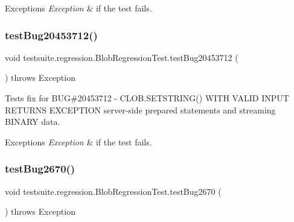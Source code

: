 \begin{DoxyExceptions}{Exceptions}
{\em Exception} & if the test fails. \\
\hline
\end{DoxyExceptions}
\mbox{\label{classtestsuite_1_1regression_1_1_blob_regression_test_a044b5dc71a945042d8533a95202d17c4}} 
\subsubsection{\texorpdfstring{test\+Bug20453712()}{testBug20453712()}}
{\footnotesize\ttfamily void testsuite.\+regression.\+Blob\+Regression\+Test.\+test\+Bug20453712 (\begin{DoxyParamCaption}{ }\end{DoxyParamCaption}) throws Exception}

Tests fix for B\+UG\#20453712 -\/ C\+L\+O\+B.\+S\+E\+T\+S\+T\+R\+I\+N\+G() W\+I\+TH V\+A\+L\+ID I\+N\+P\+UT R\+E\+T\+U\+R\+NS E\+X\+C\+E\+P\+T\+I\+ON server-\/side prepared statements and streaming B\+I\+N\+A\+RY data.


\begin{DoxyExceptions}{Exceptions}
{\em Exception} & if the test fails. \\
\hline
\end{DoxyExceptions}
\mbox{\label{classtestsuite_1_1regression_1_1_blob_regression_test_ade5e73c4533b3bad28500f3ece35dc94}} 
\subsubsection{\texorpdfstring{test\+Bug2670()}{testBug2670()}}
{\footnotesize\ttfamily void testsuite.\+regression.\+Blob\+Regression\+Test.\+test\+Bug2670 (\begin{DoxyParamCaption}{ }\end{DoxyParamCaption}) throws Exception}


